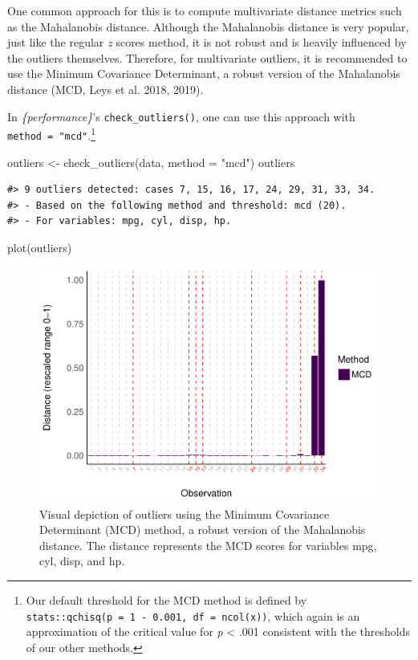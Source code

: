 \documentclass{article}
\newenvironment{Shaded}{\begin{snugshade}}{\end{snugshade}}
\newcommand{\AttributeTok}[1]{\textcolor[rgb]{0.77,0.63,0.00}{#1}}
\newcommand{\FunctionTok}[1]{\textcolor[rgb]{0.00,0.00,0.00}{#1}}
\newcommand{\NormalTok}[1]{#1}
\newcommand{\OtherTok}[1]{\textcolor[rgb]{0.56,0.35,0.01}{#1}}
\newcommand{\StringTok}[1]{\textcolor[rgb]{0.31,0.60,0.02}{#1}}
\begin{document}
One common approach for this is to compute multivariate distance metrics
such as the Mahalanobis distance. Although the Mahalanobis distance is
very popular, just like the regular \emph{z} scores method, it is not
robust and is heavily influenced by the outliers themselves. Therefore,
for multivariate outliers, it is recommended to use the Minimum
Covariance Determinant, a robust version of the Mahalanobis distance
(MCD, Leys et al. 2018, 2019).

In \emph{\{performance\}}'s \texttt{check\_outliers()}, one can use this
approach with \texttt{method\ =\ "mcd"}.\footnote{Our default threshold
  for the MCD method is defined by
  \texttt{stats::qchisq(p\ =\ 1\ -\ 0.001,\ df\ =\ ncol(x))}, which
  again is an approximation of the critical value for \emph{p}
  \textless{} .001 consistent with the thresholds of our other methods.}

\begin{Shaded}
\begin{Highlighting}[]
\NormalTok{outliers }\OtherTok{\textless{}{-}} \FunctionTok{check\_outliers}\NormalTok{(data, }\AttributeTok{method =} \StringTok{"mcd"}\NormalTok{)}
\NormalTok{outliers}
\end{Highlighting}
\end{Shaded}

\begin{verbatim}
#> 9 outliers detected: cases 7, 15, 16, 17, 24, 29, 31, 33, 34.
#> - Based on the following method and threshold: mcd (20).
#> - For variables: mpg, cyl, disp, hp.
\end{verbatim}

\begin{Shaded}
\begin{Highlighting}[]
\FunctionTok{plot}\NormalTok{(outliers)}
\end{Highlighting}
\end{Shaded}

\begin{figure}
\includegraphics[width=1\linewidth]{paper_files/figure-latex/multivariate_implicit-1} \caption{Visual depiction of outliers using the Minimum Covariance Determinant (MCD) method, a robust version of the Mahalanobis distance. The distance represents the MCD scores for variables mpg, cyl, disp, and hp.}\label{fig:multivariate_implicit}
\end{figure}
\end{document}
